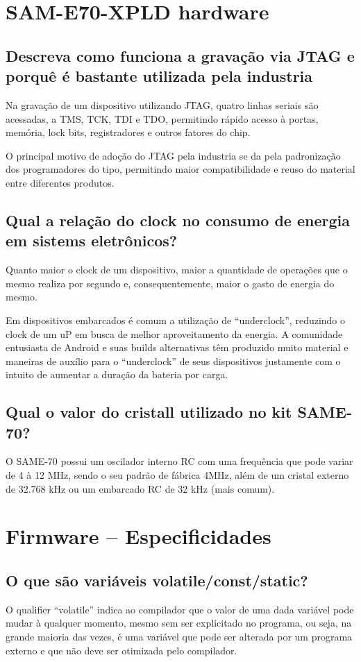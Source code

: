 \documentclass[11pt]{article}
\begin{document}
  \section{SAM-E70-XPLD hardware}
\label{sec:orgheadline4}
  \subsection{Descreva como funciona a gravação via JTAG e porquê é
    bastante utilizada pela industria}
\label{sec:orgheadline4}
  Na gravação de um dispositivo utilizando JTAG, quatro linhas seriais são
  acessadas, a TMS, TCK, TDI e TDO, permitindo rápido acesso à portas, memória,
  lock bits, registradores e outros fatores do chip.

  O principal motivo de adoção do JTAG pela industria se da pela padronização
  dos programadores do tipo, permitindo maior compatibilidade e reuso do
  material entre diferentes produtos.

  \subsection{Qual a relação do clock no consumo de energia em sistems eletrônicos?}
\label{sec:orgheadline4}
  Quanto maior o clock de um dispositivo, maior a quantidade de operações que o
  mesmo realiza por segundo e, consequentemente, maior o gasto de energia do
  mesmo.

  Em dispositivos embarcados é comum a utilização de ``underclock'', reduzindo o
  clock de um uP em busca de melhor aproveitamento da energia. A comunidade
  entusiasta de Android e suas builds alternativas têm produzido muito material
  e maneiras de auxílio para o ``underclock'' de seus dispositivos justamente
  com o intuito de aumentar a duração da bateria por carga.

  \subsection{Qual o valor do cristall utilizado no kit SAME-70?}
\label{sec:orgheadline4}
  O SAME-70 possui um oscilador interno RC com uma frequência que pode variar de
  4 à 12 MHz, sendo o seu padrão de fábrica 4MHz, além de um cristal externo
  de 32.768 kHz ou um embarcado RC de 32 kHz (mais comum).

  \section{Firmware -- Especificidades}
  \subsection{O que são variáveis volatile/const/static?}
\label{sec:orgheadline4}
  O qualifier ``volatile'' indica ao compilador que o valor de uma dada variável
  pode mudar à qualquer momento, mesmo sem ser explicitado no programa, ou seja,
  na grande maioria das vezes, é uma variável que pode ser alterada por um
  programa externo e que não deve ser otimizada pelo compilador.
\end{document}
